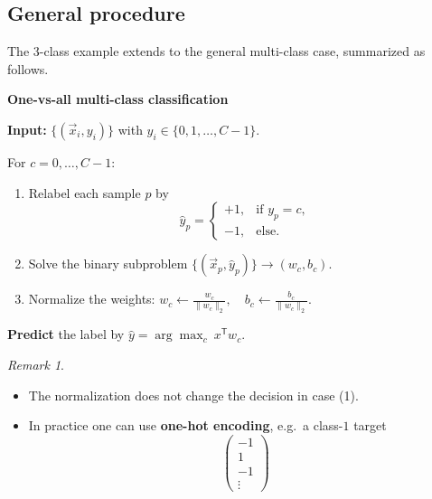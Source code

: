 \documentclass[
  letterpaper,
  DIV=11,
  numbers=noendperiod]{scrreprt}
\providecommand{\tightlist}{%
  \setlength{\itemsep}{0pt}\setlength{\parskip}{0pt}}
\theoremstyle{definition}
\theoremstyle{plain}
\theoremstyle{plain}
\theoremstyle{definition}
\theoremstyle{plain}
\theoremstyle{plain}
\theoremstyle{remark}
\newtheorem*{remark}{Remark}
\begin{document}
\subsection{General procedure}\label{general-procedure}

The 3-class example extends to the general multi-class case, summarized
as follows.

\begin{tcolorbox}[enhanced jigsaw, leftrule=.75mm, bottomrule=.15mm, left=2mm, colback=white, colframe=quarto-callout-note-color-frame, toprule=.15mm, breakable, arc=.35mm, rightrule=.15mm, opacityback=0]
\begin{minipage}[t]{5.5mm}
\textcolor{quarto-callout-note-color}{\faInfo}
\end{minipage}%
\begin{minipage}[t]{\textwidth - 5.5mm}

\vspace{-3mm}\textbf{One-vs-all multi-class classification}\vspace{3mm}

\textbf{Input:} \(\{(\vec{x}_i, y_i)\}\) with
\(y_i \in \{0, 1, \dots, C-1\}\).

For \(c = 0, \dots, C-1\):

\begin{enumerate}
\def\labelenumi{\arabic{enumi}.}
\tightlist
\item
  Relabel each sample \(p\) by \[
  \hat{y}_p =
  \begin{cases}
  +1, & \text{if } y_p = c, \\
  -1, & \text{else}.
  \end{cases}
  \]
\item
  Solve the binary subproblem
  \(\{(\vec{x}_p, \hat{y}_p)\} \to (w_c, b_c)\).
\item
  Normalize the weights:
  \(\displaystyle w_c \leftarrow \frac{w_c}{\|w_c\|_2}, \quad b_c \leftarrow \frac{b_c}{\|w_c\|_2}\).
\end{enumerate}

\textbf{Predict} the label by
\(\hat{y} = \arg\max_c \ x^{\mathsf T} w_c\).

\end{minipage}%
\end{tcolorbox}

\begin{remark}
\leavevmode

\begin{itemize}
\tightlist
\item
  The normalization does not change the decision in case (1).
\item
  In practice one can use \textbf{one-hot encoding}, e.g.~a class-\(1\)
  target \[
  \begin{pmatrix} -1 \\ 1 \\ -1 \\ \vdots \end{pmatrix}
  \]
\end{itemize}

\end{remark}
\end{document}
